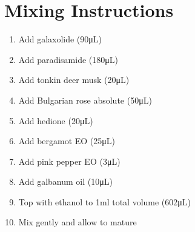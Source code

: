\documentclass{article}
\begin{document}
\section{Mixing Instructions}
\begin{enumerate}
\item Add galaxolide (90\si{\micro\liter})
\item Add paradisamide (180\si{\micro\liter}) 
\item Add tonkin deer musk (20\si{\micro\liter})
\item Add Bulgarian rose absolute (50\si{\micro\liter})
\item Add hedione (20\si{\micro\liter})
\item Add bergamot EO (25\si{\micro\liter})
\item Add pink pepper EO (3\si{\micro\liter})
\item Add galbanum oil (10\si{\micro\liter})
\item Top with ethanol to 1ml total volume (602\si{\micro\liter})
\item Mix gently and allow to mature
\end{enumerate}
\end{document}

